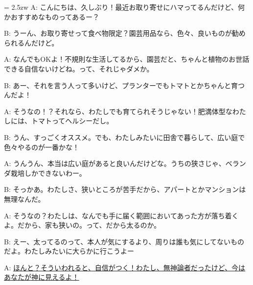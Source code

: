 \documentclass[11pt]{amsart}
\title{}
\author{}
\newenvironment{hangall}[1]{\hangindent = 2.5zw\everypar{\hangindent = 2.5zw}}{}
\begin{document}
\maketitle
\begin{hangall}{}%
A: こんにちは、久しぶり！最近お取り寄せにハマってるんだけど、何かおすすめなものってあるー？

B: うーん、お取り寄せって食べ物限定？園芸用品なら、色々、良いものが勧められるんだけど。

A: なんでもOKよ！不規則な生活してるから、園芸だと、ちゃんと植物のお世話できる自信ないけどね。って、それじゃダメか。

B: あー、それを言う人って多いけど、プランターでもトマトとかちゃんと育つんだよ！

A: そうなの！？それなら、わたしでも育てられそうじゃない！肥満体型なわたしには、トマトってヘルシーだし。

B: うん、すっごくオススメ。でも、わたしみたいに田舎で暮らして、広い庭で色々やるのが一番かな！

A: うんうん、本当は広い庭があると良いんだけどな。うちの狭さじゃ、ベランダ栽培しかできないわー。

B: そっかあ。わたしさ、狭いところが苦手だから、アパートとかマンションは無理なんだ。

A: そうなの？わたしは、なんでも手に届く範囲においてあった方が落ち着くよ。だから、家も狭いの。って、だから太るのか。

B: えー、太ってるのって、本人が気にするより、周りは誰も気にしてないものだよ。わたしみたいに大らかに行こうよー

A: \ul{ほんと？そういわれると、自信がつく！わたし、無神論者だったけど、今はあなたが神に見えるよ！}\end{hangall}
\end{document}
